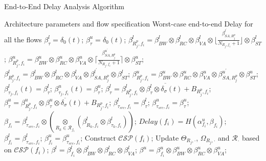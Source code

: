 \documentclass[10pt,journal]{IEEEtran}
\begin{document}
\begin{algorithm}
\caption{End-to-End Delay Analysis Algorithm}
\label{alg:equivalentservicecurve}
\begin{algorithmic}[1]
\REQUIRE Architecture parameters and flow specification
\ENSURE Worst-case end-to-end Delay for all the flows
        \STATE $\beta_{\tau}^l=\delta_0(t)$; $\beta_{\tau}^u=\delta_0(t)$;
                \STATE $\beta_{R_j^{p},f_i}^l=\beta_{BW}^l\otimes\beta_{RC}^l\otimes\beta_{VA}^l\otimes\lfloor\frac{\beta_{SA,R_j^{p}}^{l^\prime}}{N_{R_j,f_i}+1}\rfloor\otimes\beta_{ST}^l$;
                \STATE $\beta_{R_j^{p},f_i}^u=\beta_{BW}^u\otimes\beta_{RC}^u\otimes\beta_{VA}^u\otimes\lceil\frac{\beta_{SA,R_j^{p}}^{u^\prime}}{N_{R_j,f_i}+1}\rceil\otimes\beta_{ST}^u$;
            \ELSE
                \STATE $\beta_{R_j^{p},f_i}^l=\beta_{BW}^l\otimes\beta_{RC}^l\otimes\beta_{VA}^l\otimes\beta_{SA,R_j^{p}}^{l^\prime}\otimes\beta_{ST}^l$;
                \STATE $\beta_{R_j^{p},f_i}^u=\beta_{BW}^u\otimes\beta_{RC}^u\otimes\beta_{VA}^u\otimes\beta_{SA,R_j^{p}}^{u^\prime}\otimes\beta_{ST}^u$;
            \ENDIF
            \STATE $\beta^{l}_{\tau_j,f_i}(t)=\beta_{\tau}^l$; $\beta^{u}_{\tau_j,f_i}(t)=\beta_{\tau}^u$;
            \STATE $\beta_{\tau}^l=\overline{\beta^l_{R_j^{p},f_i}\otimes\beta^{l}_{\tau}\otimes\delta_\sigma(t)+B_{R_j^{p},f_i}}$;
            \STATE $\beta_{\tau}^u=\overline{\beta^u_{R_j^{p},f_i}\otimes\beta^{u}_{\tau}\otimes\delta_\sigma(t)+B_{R_j^{p},f_i}}$;
        \ENDFOR
        \STATE $\beta_{\tau_{src},f_i}^l=\beta^l_{\tau}$; $\beta_{\tau_{src},f_i}^u=\beta^u_{\tau}$;
        \STATE $\beta_{f_i}=\beta_{\tau_{src},f_i}^l\otimes (\underset{R_k\in\mathcal{R}_{f_i}}{\otimes}(\beta^l_{R_k,f_i}\otimes\beta^l_{\tau_k,f_i}))$;
        \STATE $Delay(f_i)=H(\alpha^u_{f_i},\beta_{f_i})$;
        \STATE $\beta_{f_i}^l=\beta_{\tau_{src},f_i}^l$; $\beta_{f_i}^u=\beta_{\tau_{src},f_i}^u$;
        \STATE Construct $\mathcal{CSP}(f_i)$;
        \STATE Update $\Theta_{R_j,\cdot}$, $\Omega_{R_j,\cdot}$ and $\mathcal{R}_{\cdot}$ based on $\mathcal{CSP}(f_i)$;
                \STATE $\beta^l=\beta^l_{f_i}\otimes\beta_{BW}^l\otimes\beta_{RC}^l\otimes\beta_{VA}^l$;
                \STATE $\beta^u=\beta^u_{f_i}\otimes\beta_{BW}^u\otimes\beta_{RC}^u\otimes\beta_{VA}^u$;

\end{algorithmic}
\end{algorithm}
\end{document}
